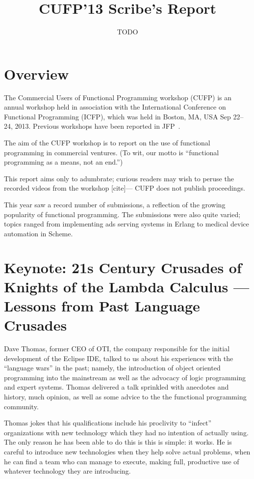 \documentclass{jfp1}
\title{CUFP'13 Scribe's Report}
\author[Authors]
        {TODO}
\newcommand\needcite{{\color{red} [cite]}\xspace}
\begin{document}
\maketitle

\tableofcontents

\section{Overview}

The Commercial Users of Functional Programming workshop (CUFP) is an
annual workshop held in association with the International Conference
on Functional Programming (ICFP), which was held in Boston, MA, USA
Sep 22--24, 2013. Previous workshops have been reported in JFP~\cite{JFP:9147276,JFP:8514633}.

The aim of the CUFP workshop is to report on the use of functional
programming in commercial ventures. (To wit, our motto is ``functional
programming as a means, not an end.'')

This report aims only to adumbrate; curious readers may wish to peruse
the recorded videos from the workshop \needcite --- CUFP does not
publish proceedings.

This year saw a record number of submissions, a reflection of the
growing popularity of functional programming. The submissions were
also quite varied; topics ranged from implementing ads serving systems
in Erlang to medical device automation in Scheme.

\section{Keynote: 21s Century Crusades of Knights of the Lambda
Calculus — Lessons from Past Language Crusades}

Dave Thomas, former CEO of OTI, the company responsible for the
initial development of the Eclipse IDE, talked to us about his
experiences with the ``language wars'' in the past; namely, the
introduction of object oriented programming into the mainstream as
well as the advocacy of logic programming and expert systems. Thomas
delivered a talk sprinkled with anecdotes and history, much opinion,
as well as some advice to the the functional programming community.


Thomas jokes that his qualifications include his proclivity to
``infect'' organizations with new technology which they had no
intention of actually using. The only reason he has been able to do
this is this is simple: it works. He is careful to introduce new
technologies when they help solve actual problems, when he can find a
team who can manage to execute, making full, productive use of
whatever technology they are introducing.
\end{document}
